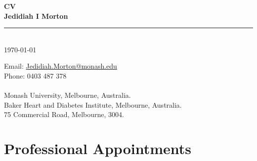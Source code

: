 \documentclass[11pt]{article}
\newcommand{\thedate}{\today}
\begin{document}
\begin{titlepage}
    \begin{center}
        \Huge
        \textbf{CV \\ Jedidiah I Morton}
\rule{16cm}{2mm} \\
\Large
\thedate \\
       \vfill
    \end{center}
        \Large

\noindent
Email: \color{blue}
 \href{mailto:Jedidiah.Morton@Monash.edu}{Jedidiah.Morton@monash.edu} \\
\color{black}
Phone: \color{blue} 0403 487 378 \\
\color{black}
 \\
Monash University, Melbourne, Australia. \\
Baker Heart and Diabetes Institute, Melbourne, Australia. \\
75 Commercial Road, Melbourne, 3004.
\end{titlepage}

\tableofcontents




\color{white}
\cite{Rodda2026HE,
MortonAth2026,
DakicECM2026,
LivoriMJA2026,
LivoriBJCP2026,
LivoriAJCD2026,
MehtaDL2026,
LloydVIH2026,
MagLDE2026,
WongJCF2026,
MortonDRCP2026,
WangDOM2026,
BraakeEJPH2025,
GongLDE2025,
ZomerDTT2025,
MortonAth2025,
WangDOM2025,
CostaEJCP2025,
RoddaPECA2025,
JensenVIH2025,
RoddaVIH2025,
MehtaJAD2025,
WangDC2025,
MortonEJPC2025,
MortonIJMI2025,
LivoriRSAP2025,
TamratJIGM2025,
MelJACI2024,
MortonPECA2024,
DMLDE2024,
DMMJA2024,
TanAJE2024,
DinaEJPC2024,
MortonVIH2024,
MehtaDRCP2024,
LivoriHLC2024,
FelekeDC2024,
ZiserBJCP2024,
ZiserJD2024,
AbebeNeur2024,
AbebeNeu2024,
DoodyAGG2024,
MacPE2024,
MortonDRCP2024,
TanCPT2024,
TanDRCP2024,
LivoriIJC2024,
LivoriEJPC2023,
MacCO2024,
AbebeEHJ2023,
MortonPECA2023,
FelekeDRCP2023,
LordPPT2023,
MortonAJKD2023,
DoodyAGG2023,
MacCirc2023,
DinaPE2023,
LloydDLOGIA2023,
MortonVIH2023,
TomicDRCP2023,
LazzDLOGIA2023,
MortonDLOGIA2023,
MortonEJPC2023,
QuigleyDRCP2022,
MacVIH2022,
TomicDRCP2022,
TomicLDE2022,
AdemiPE2022,
MortonDRCP2022,
MortonDM2022b,
MortonJECH2022,
OyunTAEM2022,
RuizDLOGIA2022,
MortonDC2022,
MortonJONS2022,
HastingsPE2022,
MortonDM2022a,
HardingNDT2022,
OyunSR2021,
MortonDC2021,
MortonDLOGIA2021,
MortonDC2020}
\color{black}
\pagebreak


\section*{Professional Appointments}
\end{document}
